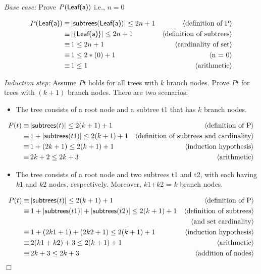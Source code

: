 \documentclass[11pt,fleqn]{article}
\newcommand{\bi}{\begin{itemize}}
\newcommand{\ei}{\end{itemize}}
\newcommand{\sglsp}{\ }
\newcommand{\mname}[1]{\mbox{\sf #1}}
\newenvironment{proof}{\par\noindent{\bf Proof\sglsp}}{\hfill$\Box$}
\newcommand{\pnote}[1]{{\langle \text{#1} \rangle}}
\begin{document}
       \begin{proof}

\textit{Base case:} Prove $P(\mname{Leaf(a)})$ i.e., $ n = 0$

\begin{align*}
P(\mname{Leaf(a)}) \equiv \,& |\mname{subtrees}(\mname{Leaf(a)})| \leq 2n + 1 & \pnote{definition of P} \\
\equiv \, &|\{\mname{Leaf(a)}\}| \leq 2n + 1 & \pnote{definition of subtrees} \\
\equiv \, & 1 \leq 2n + 1 & \pnote{cardinality of set} \\
\equiv \, & 1 \leq 2*(0) + 1 & \pnote{n = 0} \\
\equiv \, & 1 \leq 1 & \pnote{arithmetic} \\
\end{align*}

\textit{Induction step:} Assume $P t$ holds for all trees with $k$ branch nodes. Prove $P t$ for trees with $(k+1)$ branch nodes. There are two scenarios:

\bi
\item The tree consists of a root node and a subtree t1 that has $k$ branch nodes. 
\ei

\begin{align*}
P(t) \equiv \,& |\mname{subtrees}(t)| \leq 2(k+1) + 1 & \pnote{definition of P} \\
\equiv \, & 1+ |\mname{subtrees}(t1)| \leq 2(k+1) + 1 & \pnote{definition of subtrees and cardinality} \\
\equiv \, & 1 + (2k+1)\leq 2(k+1) + 1 & \pnote{induction hypothesis} \\
\equiv \, & 2k+2 \leq 2k+3 & \pnote{arithmetic} \\
\end{align*}

\bi
\item The tree consists of a root node and two subtrees t1 and t2, with each having
$k1$ and $k2$ nodes, respectively.  Moreover, $k1$+$k2$ = $k$ branch nodes. 
\ei

\begin{align*}
P(t) \equiv \,& |\mname{subtrees}(t)| \leq 2(k+1) + 1 & \pnote{definition of P} \\
\equiv \, & 1+ |\mname{subtrees}(t1)| + |\mname{subtrees}(t2)| \leq 2(k+1) + 1 & \pnote{definition of subtrees} \\
& &  \pnote{and set cardinality} \\
\equiv \, & 1 + (2k1+1) + (2k2+1) \leq 2(k+1) + 1 & \pnote{induction hypothesis} \\
\equiv \, & 2(k1+k2) + 3 \leq 2(k+1) + 1 & \pnote{arithmetic} \\
\equiv \, & 2k+3  \leq 2k+3 & \pnote{addition of nodes} \\
\end{align*} 

\end{proof}
\end{document}
